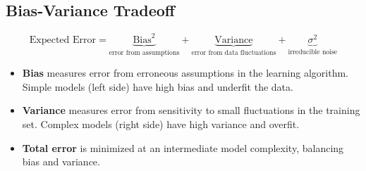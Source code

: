 \subsection*{Bias-Variance Tradeoff}

\begin{definition}
\[
\text{Expected Error} = \underbrace{\text{Bias}^2}_{\text{error from assumptions}} + \underbrace{\text{Variance}}_{\text{error from data fluctuations}} + \underbrace{\sigma^2}_{\text{irreducible noise}}
\]
\end{definition}

\begin{itemize}
    \item \textbf{Bias} measures error from erroneous assumptions in the learning algorithm. Simple models (left side) have high bias and underfit the data.
    \item \textbf{Variance} measures error from sensitivity to small fluctuations in the training set. Complex models (right side) have high variance and overfit.
    \item \textbf{Total error} is minimized at an intermediate model complexity, balancing bias and variance.
\end{itemize}